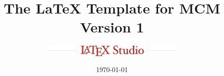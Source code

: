 \usepackage{xcolor}
\usepackage{minted}
\makeatletter
\renewenvironment{minted@colorbg}[1]{
\setlength{\fboxsep}{\z@}
\def\minted@bgcol{#1}
\noindent
\begin{lrbox}{\minted@bgbox}
\begin{minipage}{\linewidth}}
{\end{minipage}
\end{lrbox}%
\colorbox{\minted@bgcol}{\usebox{\minted@bgbox}}}
\makeatother
{}
\renewcommand{\theFancyVerbLine}{\textcolor[rgb]{0.5,0.5,1.0}{\footnotesize\arabic{FancyVerbLine}}}
\usepackage[ruled,vlined]{algorithm2e}

\usepackage[color=red]{attachfile2}
\usepackage{fancyhdr,lastpage}
\pagestyle{fancy}
\fancyhf{}
\renewcommand{\headwidth}{\linewidth}
\lhead{\small\sffamily \team}
\setlength\parskip{.5\baselineskip}

\usepackage{hyperref}
\usepackage{mathptmx}%
\usepackage{lipsum}
\title{The \LaTeX{} Template for MCM Version 1}
\author{\small \href{http://www.latexstudio.net/}
	{\includegraphics[width=7cm]{mcmthesis-logo}}}
\date{\today}
